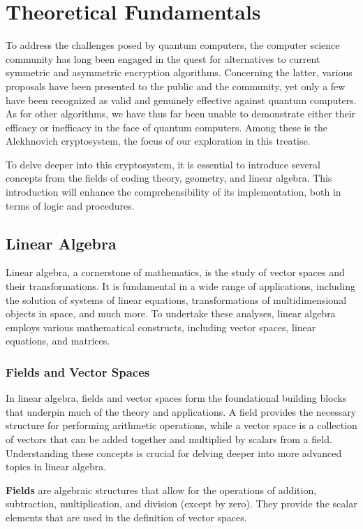 \chapter{Theoretical Fundamentals}
\theoremstyle{definition}

To address the challenges posed by quantum computers, the computer science
community has long been engaged in the quest for alternatives to current symmetric and asymmetric encryption algorithms. Concerning the latter, various proposals have been presented to the public and the community, yet only a few have been recognized as valid and genuinely effective against quantum computers. As for other algorithms, we have thus far been unable to demonstrate either their efficacy or inefficacy in the face of quantum computers. Among these is the Alekhnovich cryptosystem, the focus of our exploration in this treatise.

To delve deeper into this cryptosystem, it is essential to introduce several concepts from the fields of coding theory, geometry, and linear algebra. This introduction will enhance the comprehensibility of its implementation, both in terms of logic and procedures.

\section{Linear Algebra}
Linear algebra, a cornerstone of mathematics, is the study of vector spaces and their transformations. It is fundamental in a wide range of applications, including the solution of systems of linear equations, transformations of multidimensional objects in space, and much more. To undertake these analyses, linear algebra employs various mathematical constructs, including vector spaces, linear equations, and matrices.

\subsection{Fields and Vector Spaces}
In linear algebra, fields and vector spaces form the foundational building blocks that underpin much of the theory and applications. A field provides the necessary structure for performing arithmetic operations, while a vector space is a collection of vectors that can be added together and multiplied by scalars from a field. Understanding these concepts is crucial for delving deeper into more advanced topics in linear algebra.

\textbf{Fields} are algebraic structures that allow for the operations of addition, subtraction, multiplication, and division (except by zero). They provide the scalar elements that are used in the definition of vector spaces.

